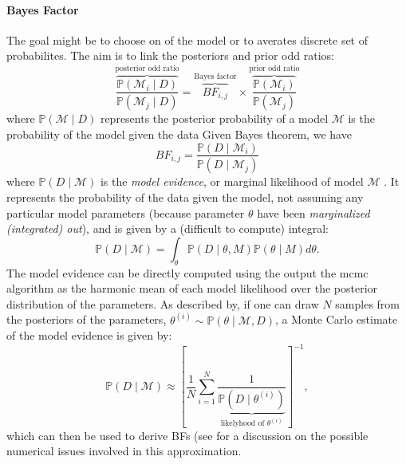 \paragraph{Bayes Factor}  The goal might be to choose on of the model or to averates discrete set of probabilites. The aim is to link the posteriors and prior odd ratios:
\begin{equation}
    \overbrace{\frac{\mathbb{P}(\mathcal{M}_i\mid D)}{\mathbb{P}(\mathcal{M}_j\mid D)}}^{\text{posterior odd ratio}} =
    \overbrace{BF_{i,j}}^\text{Bayes factor} \times  \overbrace{\frac{\mathbb{P}(\mathcal{M}_i)}{\mathbb{P}(\mathcal{M}_j)}}^{\text{prior odd ratio}}
\end{equation}
 where $\mathbb{P}(\mathcal{M}\mid D)$ represents the posterior probability of a model $\mathcal{M}$ is the probability of the model given the data
Given Bayes theorem, we have
\begin{equation}
  BF_{i,j} = \frac{\mathbb{P}(D\mid\mathcal{M}_i)}{\mathbb{P}(D\mid\mathcal{M}_j)}
\end{equation}
 where $\mathbb{P}(D\mid\mathcal{M})$ is  the \textit{model evidence}, or marginal likelihood of model $\mathcal{M}$ \parencite{Aitkin:PosteriorBayesFactors:1991}. It represents the probability of the data given the model, not assuming any particular model parameters (because parameter $\theta$ have been \textit{marginalized (integrated) out}), and is given by a (difficult to compute) integral:
 \begin{equation}
\mathbb{P}(D\mid\mathcal{M}) = \int_\theta \mathbb{P}(D\mid\theta,M) \mathbb{P}(\theta\mid M) d\theta .
\end{equation} 
 The model evidence can be directly computed using the output the mcmc algorithm as the harmonic mean of each model likelihood over the posterior distribution of the parameters. As described by\textcite{Weinberg:ComputingBayesFactor:2012}, if one can draw $N$ samples from the posteriors of the parameters, $\theta^{(i)} \sim \mathbb{P}(\theta\mid\mathcal{M}, D)$, a Monte Carlo estimate of the model evidence is given by:
 \begin{equation}
 	\mathbb{P}(D\mid\mathcal{M}) \approx {\left[ \frac{1}{N} \sum_{i=1}^N \frac{1}{\underbrace{\mathbb{P}(D\mid\theta^{(i)})}_{\text{likelyhood of } \theta^{(i)}}} \right]^{-1}}, 
 \end{equation}
which can then be used to derive BFs (see \parencite{Raftery:EstimatingIntegratedLikelihood:2007} for a discussion on the possible numerical issues involved in this approximation.

